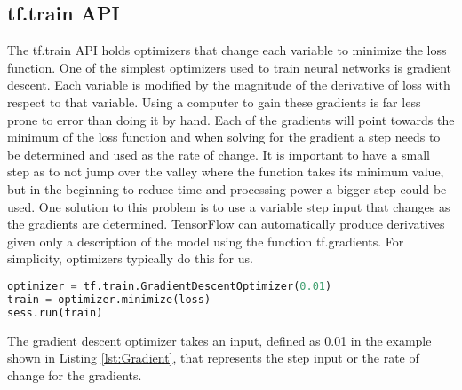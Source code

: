 \subsection{tf.train API}
The tf.train API holds optimizers that change each variable to minimize the loss function.
One of the simplest optimizers used to train neural networks is gradient descent.
Each variable is modified by the magnitude of the derivative of loss with respect to that variable.
Using a computer to gain these gradients is far less prone to error than doing it by hand.
Each of the gradients will point towards the minimum of the loss function and when solving for the gradient a step needs to be determined and used as the rate of change.
It is important to  have a small step as to not jump over the valley where the function takes its minimum value,
but in the beginning to reduce time and processing power a bigger step could be used.
One solution to this problem is to use a variable step input that changes as the gradients are determined.
TensorFlow can automatically produce derivatives given only a description of the model using the function tf.gradients.
For simplicity, optimizers typically do this for us.
\begin{lstlisting}[language=Python, label ={lst:Gradient}, caption=The gradient descent optimizer.]
optimizer = tf.train.GradientDescentOptimizer(0.01)
train = optimizer.minimize(loss)
sess.run(train)
\end{lstlisting}
The gradient descent optimizer takes an input, defined as 0.01 in the example shown in Listing \ref{lst:Gradient},
that represents the step input or the rate of change for the gradients.

